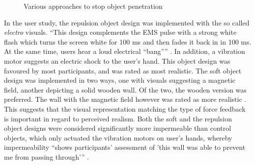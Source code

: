 \begin{figure}[h]
    \centering
    \hfill
    \hfill
    \caption{Various approaches to stop object penetration \autocite{wallHaptics}}
    \label{fig:wallHapticsDesigns}
\end{figure}

In the user study, the repulsion object design was implemented with the so called \textit{electro} visuals. \enquote{This design complements the EMS pulse with a strong white flash which turns the screen white for 100 ms and then fades it back in in 100 ms. At the same time, users hear a loud electrical “bang”} \autocite[p. ~3]{wallHaptics}. In addition, a vibration motor suggests an electric shock to the user's hand. This object design was favoured by most participants, and was rated as most realistic.
\newline
The soft object design was implemented in two ways, one with visuals suggesting a magnetic field, another depicting a solid wooden wall. Of the two, the wooden version was preferred. The wall with the magnetic field however was rated as more realistic \autocite[p. ~4]{wallHaptics}. This suggests that the visual representation matching the type of force feedback is important in regard to perceived realism.
\newline
Both the soft and the repulsion object designs were considered significantly more impermeable than control objects, which only actuated the vibration motors on user's hands, whereby impermeability \enquote{shows participants’ assessment of
'this wall was able to prevent me from passing through'} \autocite[p. ~5]{wallHaptics}.



